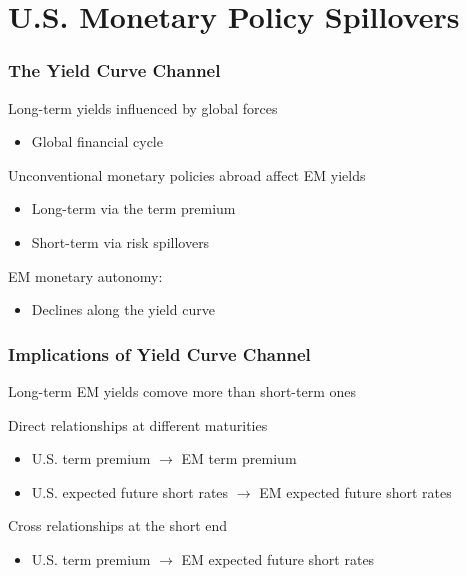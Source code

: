 \documentclass[12pt, aspectratio=169, xcolor=dvipsnames]{beamer}
\begin{document}
\section{U.S. Monetary Policy Spillovers}

\begin{frame}
\frametitle{The Yield Curve Channel}
\alert{Long-term yields} influenced by global forces
\begin{itemize}
	\item Global financial cycle \citep{Rey:2013}
\end{itemize}

\alert{Unconventional} monetary policies abroad affect EM yields
\begin{itemize}
	\item Long-term via the term premium \citep{Turner:2014}
	\item Short-term via risk spillovers \citep{Kalemli-Ozcan:2019} 
\end{itemize}

EM \alert{monetary autonomy}:
\begin{itemize}
	\item Declines along the yield curve \citep{Obstfeld:2015}
	
\end{itemize}
\end{frame}


\begin{frame}
\frametitle{Implications of Yield Curve Channel}

Long-term EM yields \alert{comove more} than short-term ones

\alert{Direct} relationships at different maturities
\begin{itemize}
\item U.S. term premium \(\rightarrow\) EM term premium
\item U.S. expected future short rates \(\rightarrow\) EM expected future short rates
\end{itemize}

\alert{Cross} relationships at the short end
\begin{itemize}
\item U.S. term premium \(\rightarrow\) EM expected future short rates
\end{itemize}

\end{frame}
\end{document}
